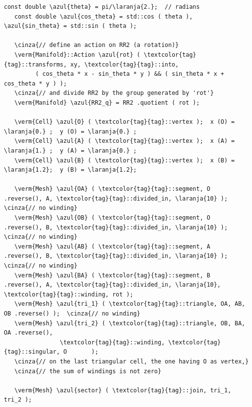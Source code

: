 \begin{Verbatim}[commandchars=\\\{\},formatcom=\small\tt,frame=single,
   label=parag-\ref{\numb section 7.\numb parag 15}.cpp,rulecolor=\color{moldura},
   baselinestretch=0.94,framesep=2mm                                             ]
   const double \azul{theta} = pi/\laranja{2.};  // radians
   const double \azul{cos_theta} = std::cos ( theta ), \azul{sin_theta} = std::sin ( theta );
	
   \cinza{// define an action on RR2 (a rotation)}
   \verm{Manifold}::Action \azul{rot} ( \textcolor{tag}{tag}::transforms, xy, \textcolor{tag}{tag}::into,
         ( cos_theta * x - sin_theta * y ) && ( sin_theta * x + cos_theta * y ) );
   \cinza{// and divide RR2 by the group generated by 'rot'}
   \verm{Manifold} \azul{RR2_q} = RR2 .quotient ( rot );

   \verm{Cell} \azul{O} ( \textcolor{tag}{tag}::vertex );  x (O) = \laranja{0.} ;  y (O) = \laranja{0.} ;
   \verm{Cell} \azul{A} ( \textcolor{tag}{tag}::vertex );  x (A) = \laranja{1.} ;  y (A) = \laranja{0.} ;
   \verm{Cell} \azul{B} ( \textcolor{tag}{tag}::vertex );  x (B) = \laranja{1.2};  y (B) = \laranja{1.2};

   \verm{Mesh} \azul{OA} ( \textcolor{tag}{tag}::segment, O .reverse(), A, \textcolor{tag}{tag}::divided_in, \laranja{10} );  \cinza{// no winding}
   \verm{Mesh} \azul{OB} ( \textcolor{tag}{tag}::segment, O .reverse(), B, \textcolor{tag}{tag}::divided_in, \laranja{10} );  \cinza{// no winding}
   \verm{Mesh} \azul{AB} ( \textcolor{tag}{tag}::segment, A .reverse(), B, \textcolor{tag}{tag}::divided_in, \laranja{10} );  \cinza{// no winding}
   \verm{Mesh} \azul{BA} ( \textcolor{tag}{tag}::segment, B .reverse(), A, \textcolor{tag}{tag}::divided_in, \laranja{10}, \textcolor{tag}{tag}::winding, rot );
   \verm{Mesh} \azul{tri_1} ( \textcolor{tag}{tag}::triangle, OA, AB, OB .reverse() );  \cinza{// no winding}
   \verm{Mesh} \azul{tri_2} ( \textcolor{tag}{tag}::triangle, OB, BA, OA .reverse(),
                \textcolor{tag}{tag}::winding, \textcolor{tag}{tag}::singular, O       );
   \cinza{// on the last triangular cell, the one having O as vertex,}
   \cinza{// the sum of windings is not zero}

   \verm{Mesh} \azul{sector} ( \textcolor{tag}{tag}::join, tri_1, tri_2 );
\end{Verbatim}

